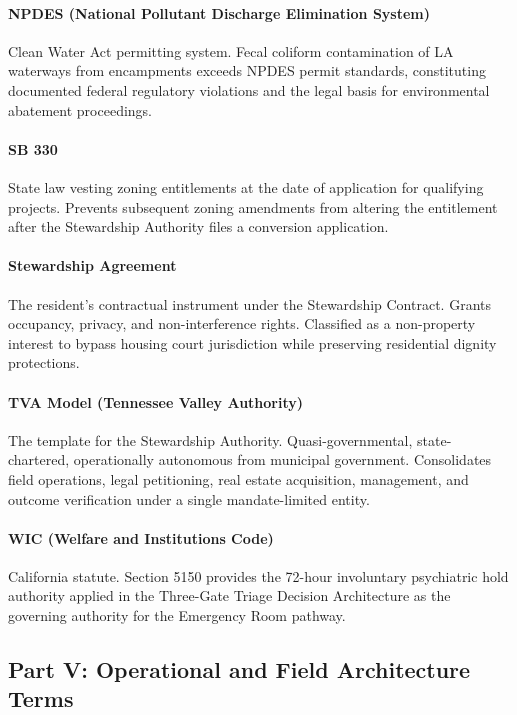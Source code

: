 {\paragraph{NPDES (National Pollutant Discharge Elimination System)} Clean Water Act permitting system. Fecal coliform contamination of LA waterways from encampments exceeds NPDES permit standards, constituting documented federal regulatory violations and the legal basis for environmental abatement proceedings.

\paragraph{SB 330} State law vesting zoning entitlements at the date of application for qualifying projects. Prevents subsequent zoning amendments from altering the entitlement after the Stewardship Authority files a conversion application.

\paragraph{Stewardship Agreement} The resident's contractual instrument under the Stewardship Contract. Grants occupancy, privacy, and non-interference rights. Classified as a non-property interest to bypass housing court jurisdiction while preserving residential dignity protections.

\paragraph{TVA Model (Tennessee Valley Authority)} The template for the Stewardship Authority. Quasi-governmental, state-chartered, operationally autonomous from municipal government. Consolidates field operations, legal petitioning, real estate acquisition, management, and outcome verification under a single mandate-limited entity.

\paragraph{WIC (Welfare and Institutions Code)} California statute. Section 5150 provides the 72-hour involuntary psychiatric hold authority applied in the Three-Gate Triage Decision Architecture as the governing authority for the Emergency Room pathway.

\subsection*{Part V: Operational and Field Architecture Terms}

}
